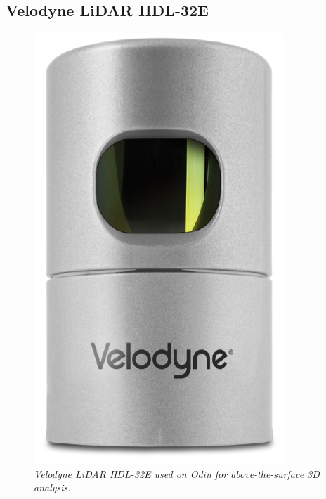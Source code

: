 \newpage
\subsection{Velodyne LiDAR HDL-32E}
\begin{figure}
	\vspace{-30pt}
	\begin{center}
		\includegraphics[width= 0.9\linewidth]{fig/VelodyneHDL32Ecase}
		\vspace{-20pt}
		\caption{\it{Velodyne LiDAR HDL-32E used on Odin for above-the-surface 3D analysis.}}
		\label{fig:velodyneCasing}
	\end{center}
	
\end{figure}
